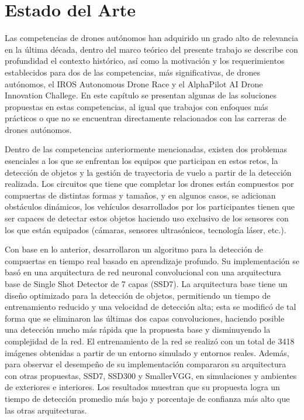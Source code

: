 \chapter{Estado del Arte}

Las competencias de drones autónomos han adquirido un grado alto de relevancia en la última década, dentro del marco teórico del presente trabajo se describe con profundidad el contexto histórico, así como la motivación y los requerimientos establecidos para dos de las competencias, más significativas, de drones autónomos, el  IROS Autonomous Drone Race y el AlphaPilot AI Drone Innovation Challege. 
En este capítulo se presentan algunas de las soluciones propuestas en estas competencias, al igual que trabajos con enfoques más prácticos o que no se encuentran directamente relacionados con las carreras de drones autónomos.

Dentro de las competencias anteriormente mencionadas, existen dos problemas esenciales a los que se enfrentan los equipos que participan en estos retos, la detección de objetos y la gestión de trayectoria de vuelo a partir de la detección realizada. 
Los circuitos que tiene que completar los drones están compuestos por compuertas de distintas formas y tamaños, y en algunos casos, se adicionan obstáculos dinámicos, los vehículos desarrollados por los participantes tienen que ser capaces de detectar estos objetos haciendo uso exclusivo de los sensores con los que están equipados (cámaras, sensores ultrasónicos, tecnología láser, etc.).

Con base en lo anterior, \cite{cabrera2019gate} desarrollaron un algoritmo para la detección de compuertas en tiempo real basado en aprendizaje profundo. Su implementación se basó en una arquitectura de red neuronal convolucional con una arquitectura base de Single Shot Detector de 7 capas (SSD7\cite{SSD7}). La arquitectura base tiene un diseño optimizado para la detección de objetos, permitiendo un tiempo de entrenamiento reducido y una velocidad de detección alta; esta se modificó de tal forma que se eliminaron las últimas dos capas convoluciones, haciendo posible una detección mucho más rápida que la propuesta base y disminuyendo la complejidad de la red. El entrenamiento de la red se realizó con un total de 3418 imágenes obtenidas a partir de un entorno simulado y entornos reales. 
Además, para observar el desempeño de su implementación compararon su arquitectura con otras propuestas, SSD7, SSD300 y SmallerVGG, en simulaciones y ambientes de exteriores e interiores. Los resultados muestran que su propuesta logra un tiempo de detección promedio más bajo y porcentaje de confianza más alto que las otras arquitecturas. 

